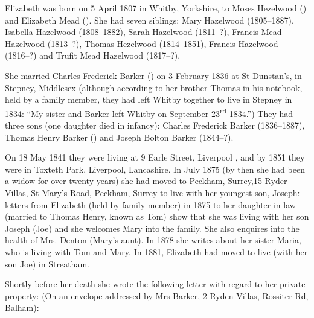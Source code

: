 
Elizabeth was born on 5 April 1807 \cite{ElizabethHazelwoodBirth} in Whitby, Yorkshire, to  Moses Hezelwood () and Elizabeth Mead ().  She had seven siblings: Mary Hazelwood (1805--1887), Isabella Hazelwood (1808--1882), Sarah Hazelwood (1811--?), Francis Mead Hazelwood (1813--?), Thomas Hezelwood (1814--1851), Francis Hazelwood (1816--?) and Trufit Mead Hazelwood (1817--?). 

She married Charles Frederick Barker () on 3 February 1836 at St Dunstan's, in Stepney, Middlesex \cite{ElizabethHazelwoodMarriage} (although according to her brother Thomas in his notebook, held by a family member, they had left Whitby together to live in Stepney in 1834: ``My sister and Barker left Whitby on September 23\textsuperscript{rd} 1834.'')  They had three sons (one daughter died in infancy):  Charles Frederick Barker (1836--1887), Thomas Henry Barker () and Joseph Bolton Barker (1844--?).

On 18 May 1841 they were living at 9 Earle Street, Liverpool \cite{ElizabethHazelwoodResidence}, and by 1851 they were in Toxteth Park, Liverpool, Lancashire. In July 1875 (by then she had been a widow for over twenty years) she had moved to	Peckham, Surrey,15 Ryder Villas, St Mary's Road, Peckham, Surrey to live with her youngest son, Joseph: letters from Elizabeth (held by family member) in 1875 to her daughter-in-law (married to Thomas Henry, known as Tom) show that she was living with her son Joseph (Joe) and she welcomes Mary into the family. She also enquires into the health of Mrs. Denton (Mary's aunt). In 1878 she writes about her sister Maria, who is living with Tom and Mary. In 1881, Elizabeth had moved to live (with her son Joe) in Streatham. 

Shortly before her death she wrote the following letter with regard to her private property: (On an envelope addressed by Mrs Barker, 2 Ryden Villas, Rossiter Rd, Balham):

